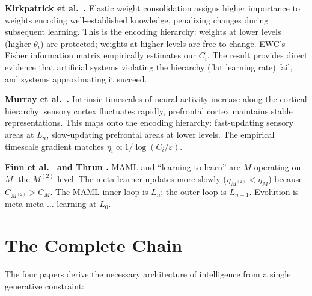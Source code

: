 \documentclass[11pt]{article}
\theoremstyle{definition}
\theoremstyle{remark}
\begin{document}
\textbf{Kirkpatrick et al.\ \cite{Kirkpatrick2017}.}
Elastic weight consolidation assigns higher importance to weights
encoding well-established knowledge, penalizing changes during
subsequent learning. This is the encoding hierarchy: weights at lower
levels (higher $\theta_i$) are protected; weights at higher levels are
free to change. EWC's Fisher information matrix empirically estimates
our $C_i$. The result provides direct evidence that artificial systems
violating the hierarchy (flat learning rate) fail, and systems
approximating it succeed.

\textbf{Murray et al.\ \cite{Murray2014}.}
Intrinsic timescales of neural activity increase along the cortical
hierarchy: sensory cortex fluctuates rapidly, prefrontal cortex
maintains stable representations. This maps onto the encoding
hierarchy: fast-updating sensory areas at $L_n$, slow-updating
prefrontal areas at lower levels. The empirical timescale gradient
matches $\eta_i \propto 1/\log(C_i / \varepsilon)$.

\textbf{Finn et al.\ \cite{FinnEtAl2017} and Thrun
\cite{Thrun1998}.}
MAML and ``learning to learn'' are $M$ operating on $M$: the
$M^{(2)}$ level. The meta-learner updates more slowly
($\eta_{M^{(2)}} < \eta_M$) because $C_{M^{(2)}} > C_M$. The MAML
inner loop is $L_n$; the outer loop is $L_{n-1}$. Evolution is
meta-meta-$\ldots$-learning at $L_0$.

\section{The Complete Chain}
\label{sec:chain}

The four papers derive the necessary architecture of intelligence from
a single generative constraint:
\end{document}
